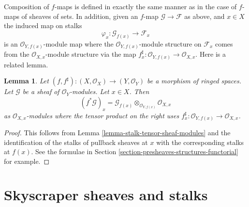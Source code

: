 \documentclass{stacks-project}
\theoremstyle{plain}
\newtheorem{lemma}[subsection]{Lemma}
\theoremstyle{definition}
\theoremstyle{remark}
\numberwithin{equation}{subsection}
\begin{document}
\medskip\noindent
Composition of $f$-maps is defined in exactly the
same manner as in the case of $f$-maps of sheaves of
sets. In addition, given an $f$-map $\mathcal{G} \to \mathcal{F}$
as above, and $x \in X$ the induced map on stalks
$$
\varphi_x : \mathcal{G}_{f(x)} \longrightarrow \mathcal{F}_x
$$
is an $\mathcal{O}_{Y, f(x)}$-module map where the
$\mathcal{O}_{Y, f(x)}$-module structure on $\mathcal{F}_x$
comes from the $\mathcal{O}_{X, x}$-module structure via
the map $f^\sharp_x : \mathcal{O}_{Y, f(x)} \to \mathcal{O}_{X, x}$.
Here is a related lemma.

\begin{lemma}
\label{lemma-stalk-pullback-modules}
Let $(f, f^\sharp) : (X, \mathcal{O}_X) \to (Y, \mathcal{O}_Y)$
be a morphism of ringed spaces.
Let $\mathcal{G}$ be a sheaf of $\mathcal{O}_Y$-modules.
Let $x \in X$. Then
$$
(f^*\mathcal{G})_x =
\mathcal{G}_{f(x)}
\otimes_{\mathcal{O}_{Y, f(x)}}
\mathcal{O}_{X, x}
$$
as $\mathcal{O}_{X, x}$-modules where the tensor product on the right
uses $f^\sharp_x : \mathcal{O}_{Y, f(x)} \to \mathcal{O}_{X, x}$.
\end{lemma}

\begin{proof}
This follows from Lemma \ref{lemma-stalk-tensor-sheaf-modules}
and the identification of the stalks of pullback sheaves
at $x$ with the corresponding stalks at $f(x)$. See the
formulae in Section \ref{section-presheaves-structures-functorial}
for example.
\end{proof}



\section{Skyscraper sheaves and stalks}
\label{section-skyscraper-sheaves}
\end{document}

